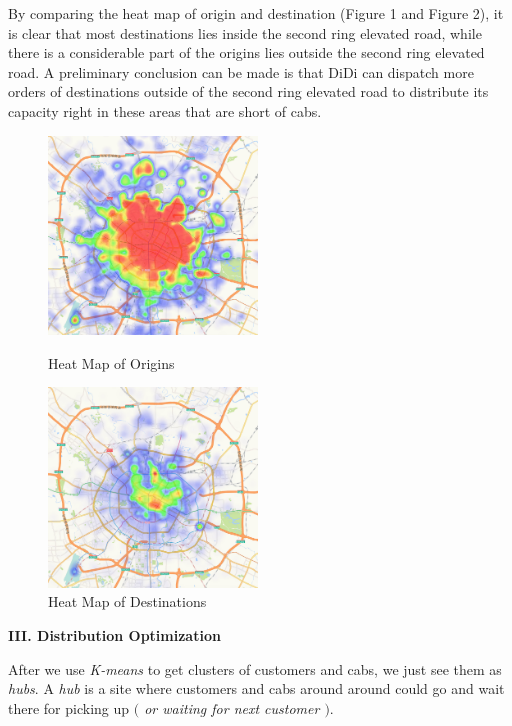 \documentclass{article}
\begin{document}
\qquad By comparing the heat map of origin and destination (Figure 1 and Figure 2), it is clear that most destinations lies inside the second ring elevated road, while there is a considerable part of the origins lies outside the second ring elevated road. A preliminary conclusion can be made is that DiDi can dispatch more orders of destinations outside of the second ring elevated road to distribute its capacity right in these areas that are short of cabs.
\begin{figure}[htbp]
	\centering
	\begin{minipage}[t]{0.4\textwidth}
		\centering
		\includegraphics[width = 15em]{start.jpg}
		\caption{Heat Map of Origins}
	\end{minipage}
	\begin{minipage}[t]{0.4\textwidth}
		\centering
		\includegraphics[width = 15em]{end.jpg}
		\caption{Heat Map of Destinations}
	\end{minipage}
\end{figure}

\begin{center}
	\textbf{III. Distribution Optimization}
\end{center}
\qquad After we use \emph{K-means} to get clusters of customers and cabs, we just see them as \emph{hubs}. A \emph{hub} is a site where customers and cabs around around could go and wait there for picking up \emph{$($ or waiting for next customer $)$}.
\end{document}
